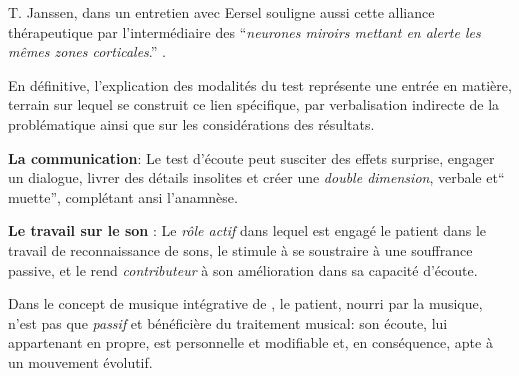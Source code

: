 T. Janssen, dans un entretien
avec Eersel
souligne aussi cette alliance thérapeutique
par l'intermédiaire des ``\textit{neurones
 miroirs mettant en alerte les mêmes zones corticales}.'' \autocite[203]{van_eersel_cerveau}.


En définitive, l'explication des modalités du test représente une
  entrée en matière, terrain  sur lequel se construit ce lien spécifique, 
  par verbalisation indirecte de la problématique ainsi que sur 
  les considérations des résultats.
  
  
   

  
\textbf{La communication}:
  Le test d'écoute 
  peut susciter des effets surprise, engager un dialogue, livrer des détails
 insolites et créer une \textit{double dimension}, verbale et``
 muette'', complétant ansi l'anamnèse.
 


 \textbf{Le travail sur le son} :
 Le \emph{rôle actif} dans lequel est engagé le patient dans le travail
de reconnaissance de sons, le stimule à se soustraire à une souffrance
passive, et  le rend  \textit{contributeur} à son amélioration dans sa capacité
d'écoute.

       
Dans le concept de musique intégrative de \autocite[Cf.]
        {vrait_musicotherapie_2018}, le patient, nourri par
        la musique, n'est pas que \textit{passif }et
        bénéficière du traitement musical: son écoute, lui
        appartenant en propre, est personnelle et modifiable %
        et, en conséquence, apte à un mouvement évolutif.

